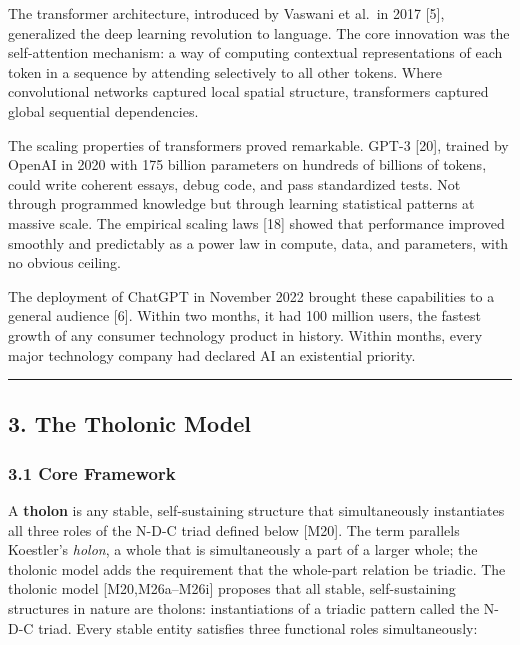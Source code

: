 \documentclass[
  11pt,
  letterpaper,
]{article}
\begin{document}
The transformer architecture, introduced by Vaswani et al.~in 2017
{[}5{]}, generalized the deep learning revolution to language. The core
innovation was the self-attention mechanism: a way of computing
contextual representations of each token in a sequence by attending
selectively to all other tokens. Where convolutional networks captured
local spatial structure, transformers captured global sequential
dependencies.

The scaling properties of transformers proved remarkable. GPT-3
{[}20{]}, trained by OpenAI in 2020 with 175 billion parameters on
hundreds of billions of tokens, could write coherent essays, debug code,
and pass standardized tests. Not through programmed knowledge but
through learning statistical patterns at massive scale. The empirical
scaling laws {[}18{]} showed that performance improved smoothly and
predictably as a power law in compute, data, and parameters, with no
obvious ceiling.

The deployment of ChatGPT in November 2022 brought these capabilities to
a general audience {[}6{]}. Within two months, it had 100 million users,
the fastest growth of any consumer technology product in history. Within
months, every major technology company had declared AI an existential
priority.

\begin{center}\rule{0.5\linewidth}{0.5pt}\end{center}

\subsection{3. The Tholonic Model}\label{the-tholonic-model}

\subsubsection{3.1 Core Framework}\label{core-framework}

A \textbf{tholon} is any stable, self-sustaining structure that
simultaneously instantiates all three roles of the N-D-C triad defined
below {[}M20{]}. The term parallels Koestler's \emph{holon}, a whole
that is simultaneously a part of a larger whole; the tholonic model adds
the requirement that the whole-part relation be triadic. The tholonic
model {[}M20,M26a--M26i{]} proposes that all stable, self-sustaining
structures in nature are tholons: instantiations of a triadic pattern
called the N-D-C triad. Every stable entity satisfies three functional
roles simultaneously:
\end{document}

